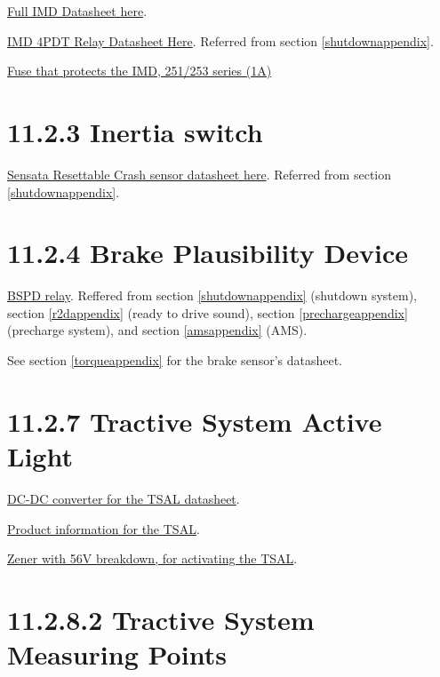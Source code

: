 \documentclass{article}
\begin{document}
{\href{http://www.bender.org/documents/IR155-10_datasheet_NAE1012821.pdf}{Full IMD Datasheet here}.

\href{http://www.automationdirect.com/static/specs/78relays.pdf}{IMD 4PDT Relay Datasheet Here}. Referred from section \ref{shutdownappendix}.

\href{http://www.littelfuse.com/~/media/electronics/datasheets/fuses/littelfuse_fuse_251_253_datasheet.pdf.pdf}{Fuse that protects the IMD, 251/253 series (1A)}

\section*{11.2.3 Inertia switch} \label{inertiaappendix}

\href{http://www.sensata.com/download/resettable-crash.pdf}{Sensata Resettable Crash sensor datasheet here}. Referred from section \ref{shutdownappendix}.

\section*{11.2.4 Brake Plausibility Device} \label{bspdappendix}

\href{http://www.te.com/commerce/DocumentDelivery/DDEController?Action=srchrtrv&DocNm=PB&DocType=DS&DocLang=English}{BSPD relay}. Reffered from section \ref{shutdownappendix} (shutdown system), section \ref{r2dappendix} (ready to drive sound), section \ref{prechargeappendix} (precharge system), and section \ref{amsappendix} (AMS).

See section \ref{torqueappendix} for the brake sensor's datasheet.

\section*{11.2.7 Tractive System Active Light}

\href{http://www.mouser.com/ds/2/281/mdc_ruw15-217876.pdf}{DC-DC converter for the TSAL datasheet}.

\href{https://www.superbrightleds.com/moreinfo/oval-marker-lamps/oval-led-truck-trailer-light-with-reflectorized-lens-4in-led-marker-clearance-light-with-4-leds/580/#/tab/Specifications}{Product information for the TSAL}.

\href{http://www.onsemi.com/pub_link/Collateral/1N5333B-D.PDF}{Zener with 56V breakdown, for activating the TSAL}.

\section*{11.2.8.2 Tractive System Measuring Points} \label{tsmpappendix}

}
\end{document}
